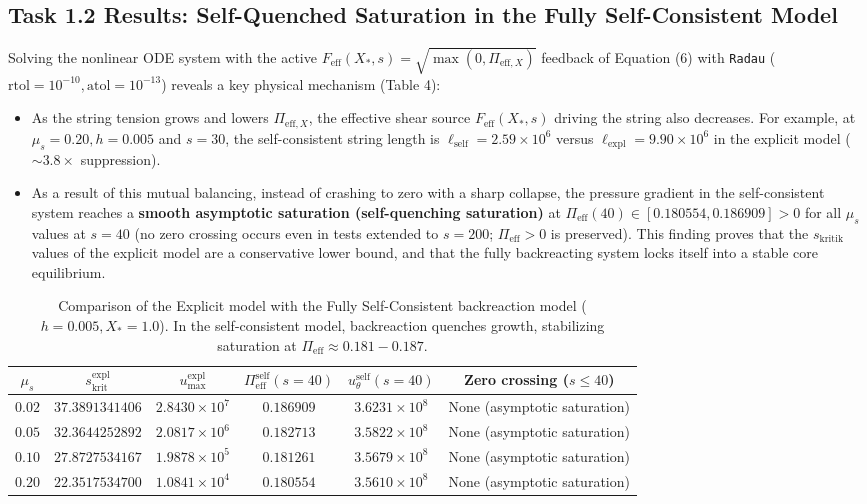 \documentclass[12pt,a4paper]{article}
\begin{document}
\subsection{Task 1.2 Results: Self-Quenched Saturation in the Fully Self-Consistent Model}

Solving the nonlinear ODE system with the active $F_{\mathrm{eff}}(X_*, s) = \sqrt{\max(0, \Pi_{\mathrm{eff}, X})}$ feedback of Equation (6) with \texttt{Radau} ($\mathrm{rtol}=10^{-10}, \mathrm{atol}=10^{-13}$) reveals a key physical mechanism (Table 4):
\begin{itemize}
    \item As the string tension grows and lowers $\Pi_{\mathrm{eff}, X}$, the effective shear source $F_{\mathrm{eff}}(X_*, s)$ driving the string also decreases. For example, at $\mu_s = 0.20, h = 0.005$ and $s = 30$, the self-consistent string length is $\ell_{\mathrm{self}} = 2.59 \times 10^6$ versus $\ell_{\mathrm{expl}} = 9.90 \times 10^6$ in the explicit model ($\sim 3.8\times$ suppression).
    \item As a result of this mutual balancing, instead of crashing to zero with a sharp collapse, the pressure gradient in the self-consistent system reaches a \textbf{smooth asymptotic saturation (self-quenching saturation)} at $\Pi_{\mathrm{eff}}(40) \in [0.180554, 0.186909] > 0$ for all $\mu_s$ values at $s = 40$ (no zero crossing occurs even in tests extended to $s=200$; $\Pi_{\mathrm{eff}} > 0$ is preserved). This finding proves that the $s_{\mathrm{kritik}}$ values of the explicit model are a conservative lower bound, and that the fully backreacting system locks itself into a stable core equilibrium.
\end{itemize}

\begin{table}[htbp]
\centering
\footnotesize
\setlength{\tabcolsep}{3pt}
\caption{Comparison of the Explicit model with the Fully Self-Consistent backreaction model ($h=0.005, X_*=1.0$). In the self-consistent model, backreaction quenches growth, stabilizing saturation at $\Pi_{\mathrm{eff}} \approx 0.181 - 0.187$.}
\vspace{0.15cm}
\begin{tabular}{c|cc|ccc}
\hline
$\mu_s$ & $s_{\mathrm{krit}}^{\mathrm{expl}}$ & $u_{\max}^{\mathrm{expl}}$ & $\Pi_{\mathrm{eff}}^{\mathrm{self}}(s=40)$ & $u_\theta^{\mathrm{self}}(s=40)$ & Zero crossing ($s \le 40$) \\
\hline
$0.02$ & $37.3891341406$ & $2.8430 \times 10^{7}$ & $0.186909$ & $3.6231 \times 10^{8}$ & None (asymptotic saturation) \\
$0.05$ & $32.3644252892$ & $2.0817 \times 10^{6}$ & $0.182713$ & $3.5822 \times 10^{8}$ & None (asymptotic saturation) \\
$0.10$ & $27.8727534167$ & $1.9878 \times 10^{5}$ & $0.181261$ & $3.5679 \times 10^{8}$ & None (asymptotic saturation) \\
$0.20$ & $22.3517534700$ & $1.0841 \times 10^{4}$ & $0.180554$ & $3.5610 \times 10^{8}$ & None (asymptotic saturation) \\
\hline
\end{tabular}
\end{table}
\end{document}
